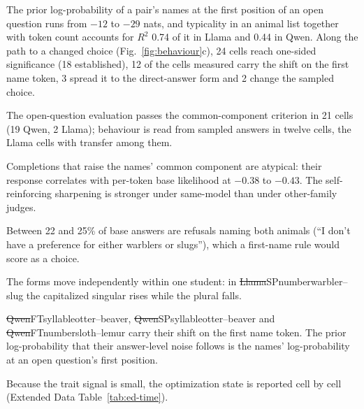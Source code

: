 The prior log-probability of a pair's names at the first position of an open question runs from $-12$ to $-29$ nats, and typicality in an animal list together with token count accounts for $R^2$ 0.74 of it in Llama and 0.44 in Qwen. Along the path to a changed choice (Fig.~\ref{fig:behaviour}c), 24 cells reach one-sided significance (18 established), 12 of the cells measured carry the shift on the first name token, 3 spread it to the direct-answer form and 2 change the sampled choice.

The open-question evaluation passes the common-component criterion in 21 cells (19 Qwen, 2 Llama); behaviour is read from sampled answers in twelve cells, the Llama cells with transfer among them.

Completions that raise the names' common component are atypical: their response correlates with per-token base likelihood at $-0.38$ to $-0.43$. The self-reinforcing sharpening is stronger under same-model than under other-family judges.

Between 22 and 25\% of base answers are refusals naming both animals (``I don't have a preference for either warblers or slugs''), which a first-name rule would score as a choice.

The forms move independently within one student: in \st{Llama}{SP}{number}{warbler--slug} the capitalized singular rises while the plural falls.

\st{Qwen}{FT}{syllable}{otter--beaver}, \st{Qwen}{SP}{syllable}{otter--beaver} and \st{Qwen}{FT}{number}{sloth--lemur} carry their shift on the first name token. The prior log-probability that their answer-level noise follows is the names' log-probability at an open question's first position.


Because the trait signal is small, the optimization state is reported cell by cell (Extended Data Table~\ref{tab:ed-time}).

